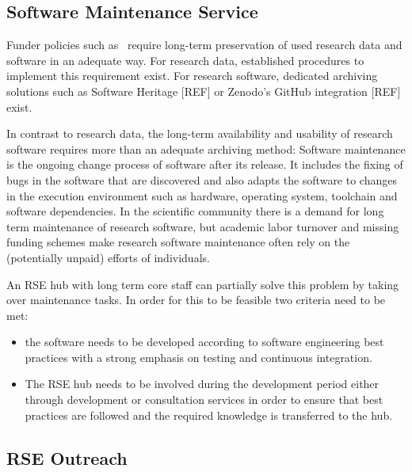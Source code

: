 \documentclass{article}
\begin{document}
\subsection{Software Maintenance Service}

Funder policies such as~\autocite{dfg_gsp} require long-term preservation of used research data and software in an adequate way.
For research data, established procedures to implement this requirement exist.
For research software, dedicated archiving solutions such as Software Heritage [REF] or Zenodo's GitHub integration [REF] exist.

In contrast to research data, the long-term availability and usability of research software requires more than an adequate archiving method:
Software maintenance is the ongoing change process of software after its release.
It includes the fixing of bugs in the software that are discovered and also adapts the software to changes in the execution environment such as hardware, operating system, toolchain and software dependencies.
In the scientific community there is a demand for long term maintenance of research software,
but academic labor turnover and missing funding schemes make research software maintenance often rely on the (potentially unpaid) efforts of individuals.

An RSE hub with long term core staff can partially solve this problem by taking over maintenance tasks.
In order for this to be feasible two criteria need to be met:
\begin{itemize}
\item the software needs to be developed according to software engineering best practices with a strong emphasis on testing and continuous integration.
\item The RSE hub needs to be involved during the development period either through development or consultation services in order to ensure that best practices are followed and the required knowledge is transferred to the hub.
\end{itemize}

\subsection{RSE Outreach}
\end{document}
